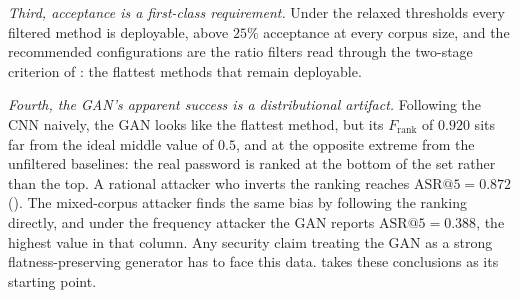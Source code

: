 \emph{Third, acceptance is a first-class requirement.} Under the relaxed
thresholds every filtered method is deployable, above $25\%$ acceptance
at every corpus size, and the recommended configurations are the ratio
filters read through the two-stage criterion of
: the flattest methods that remain deployable.

\emph{Fourth, the GAN's apparent success is a distributional artifact.}
Following the CNN naively, the GAN looks like the flattest method, but
its $F_{\text{rank}}$ of $0.920$ sits far from the ideal middle value of
$0.5$, and at the opposite extreme from the unfiltered baselines: the
real password is ranked at the bottom of the set rather than the top. A
rational attacker who inverts the ranking reaches
$\mathrm{ASR}@5 = 0.872$ (). The mixed-corpus attacker
finds the same bias by following the ranking directly, and under the
frequency attacker the GAN reports $\mathrm{ASR}@5 = 0.388$, the highest
value in that column. Any security claim treating the GAN as a strong
flatness-preserving generator has to face this data.
 takes these conclusions as its starting point.